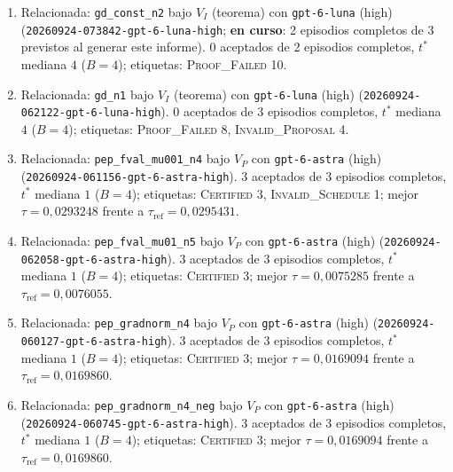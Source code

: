 \documentclass[11pt,a4paper]{article}
\begin{document}
{\begin{enumerate}
  \item Relacionada: \texttt{gd\_\allowbreak{}const\_\allowbreak{}n2} bajo $V_I$ (teorema) con \texttt{gpt-\allowbreak{}6-\allowbreak{}luna} (high) (\texttt{20260924-\allowbreak{}073842-\allowbreak{}gpt-\allowbreak{}6-\allowbreak{}luna-\allowbreak{}high}; \textbf{en curso}: 2 episodios completos de 3 previstos al generar este informe). 0 aceptados de 2 episodios completos, $t^*$ mediana $4$ ($B = 4$); etiquetas: \textsc{Proof\_Failed} 10.
  \item Relacionada: \texttt{gd\_\allowbreak{}n1} bajo $V_I$ (teorema) con \texttt{gpt-\allowbreak{}6-\allowbreak{}luna} (high) (\texttt{20260924-\allowbreak{}062122-\allowbreak{}gpt-\allowbreak{}6-\allowbreak{}luna-\allowbreak{}high}). 0 aceptados de 3 episodios completos, $t^*$ mediana $4$ ($B = 4$); etiquetas: \textsc{Proof\_Failed} 8, \textsc{Invalid\_Proposal} 4.
  \item Relacionada: \texttt{pep\_\allowbreak{}fval\_\allowbreak{}mu001\_\allowbreak{}n4} bajo $V_P$ con \texttt{gpt-\allowbreak{}6-\allowbreak{}astra} (high) (\texttt{20260924-\allowbreak{}061156-\allowbreak{}gpt-\allowbreak{}6-\allowbreak{}astra-\allowbreak{}high}). 3 aceptados de 3 episodios completos, $t^*$ mediana $1$ ($B = 4$); etiquetas: \textsc{Certified} 3, \textsc{Invalid\_Schedule} 1; mejor $\tau = 0{,}0293248$ frente a $\tau_{\mathrm{ref}} = 0{,}0295431$.
  \item Relacionada: \texttt{pep\_\allowbreak{}fval\_\allowbreak{}mu01\_\allowbreak{}n5} bajo $V_P$ con \texttt{gpt-\allowbreak{}6-\allowbreak{}astra} (high) (\texttt{20260924-\allowbreak{}062058-\allowbreak{}gpt-\allowbreak{}6-\allowbreak{}astra-\allowbreak{}high}). 3 aceptados de 3 episodios completos, $t^*$ mediana $1$ ($B = 4$); etiquetas: \textsc{Certified} 3; mejor $\tau = 0{,}0075285$ frente a $\tau_{\mathrm{ref}} = 0{,}0076055$.
  \item Relacionada: \texttt{pep\_\allowbreak{}gradnorm\_\allowbreak{}n4} bajo $V_P$ con \texttt{gpt-\allowbreak{}6-\allowbreak{}astra} (high) (\texttt{20260924-\allowbreak{}060127-\allowbreak{}gpt-\allowbreak{}6-\allowbreak{}astra-\allowbreak{}high}). 3 aceptados de 3 episodios completos, $t^*$ mediana $1$ ($B = 4$); etiquetas: \textsc{Certified} 3; mejor $\tau = 0{,}0169094$ frente a $\tau_{\mathrm{ref}} = 0{,}0169860$.
  \item Relacionada: \texttt{pep\_\allowbreak{}gradnorm\_\allowbreak{}n4\_\allowbreak{}neg} bajo $V_P$ con \texttt{gpt-\allowbreak{}6-\allowbreak{}astra} (high) (\texttt{20260924-\allowbreak{}060745-\allowbreak{}gpt-\allowbreak{}6-\allowbreak{}astra-\allowbreak{}high}). 3 aceptados de 3 episodios completos, $t^*$ mediana $1$ ($B = 4$); etiquetas: \textsc{Certified} 3; mejor $\tau = 0{,}0169094$ frente a $\tau_{\mathrm{ref}} = 0{,}0169860$.

\end{enumerate}}
\end{document}
